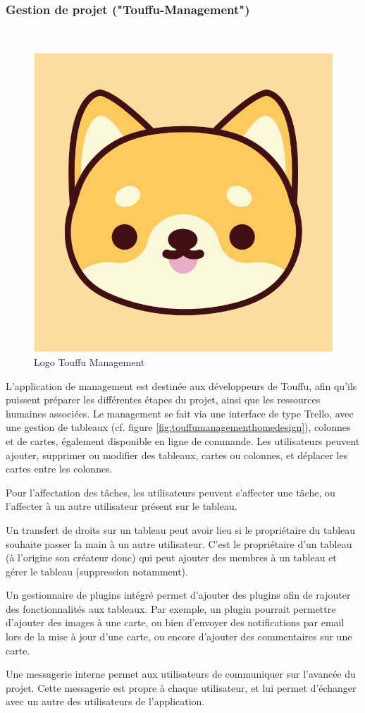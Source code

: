 \documentclass[conference]{IEEEtran}
\begin{document}
\subsubsection{Gestion de projet ("Touffu-Management")}\hfil\\

\begin{figure}[h]
	\centering
	\includegraphics[width=0.4\columnwidth]{Ressources/Icons/v1_1@3x.png}
	\caption{Logo Touffu Management}
	\label{fig:logotouffu-management}
\end{figure}

L'application de management est destinée aux développeurs de Touffu, afin qu'ils puissent préparer les différentes étapes du projet, ainsi que les ressources humaines associées. Le management se fait via une interface de type Trello, avec une gestion de tableaux (cf. figure \ref{fig:touffumanagementhomedesign}), colonnes et de cartes, également disponible en ligne de commande. Les utilisateurs peuvent ajouter, supprimer ou modifier des tableaux, cartes ou colonnes, et déplacer les cartes entre les colonnes.

Pour l'affectation des tâches, les utilisateurs peuvent s'affecter une tâche, ou l'affecter à un autre utilisateur présent sur le tableau.

Un transfert de droits sur un tableau peut avoir lieu si le propriétaire du tableau souhaite passer la main à un autre utilisateur. C'est le propriétaire d'un tableau (à l'origine son créateur donc) qui peut ajouter des membres à un tableau et gérer le tableau (suppression notamment).

Un gestionnaire de plugins intégré permet d'ajouter des plugins afin de rajouter des fonctionnalités aux tableaux. Par exemple, un plugin pourrait permettre d'ajouter des images à une carte, ou bien d'envoyer des notifications par email lors de la mise à jour d'une carte, ou encore d'ajouter des commentaires sur une carte.

Une messagerie interne permet aux utilisateurs de communiquer sur l'avancée du projet. Cette messagerie est propre à chaque utilisateur, et lui permet d'échanger avec un autre des utilisateurs de l'application.
\end{document}
